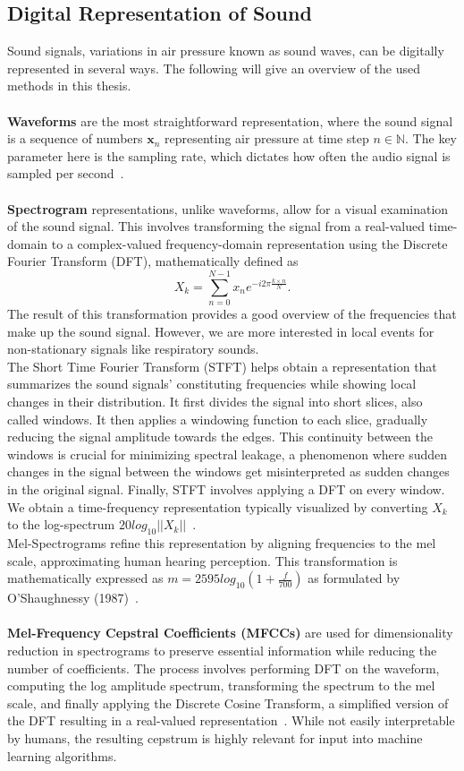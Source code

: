 \subsection{Digital Representation of Sound}
Sound signals, variations in air pressure known as sound waves, can be digitally represented in several ways. The following will give an overview of the used methods in this thesis.\\\\
\textbf{Waveforms} are the most straightforward representation, where the sound signal is a sequence of numbers $\mathbf{x}_n$ representing air pressure at time step $n\in \mathbb{N}$. The key parameter here is the sampling rate, which dictates how often the audio signal is sampled per second~\cite{backstrom2020introduction}.\\\\
\textbf{Spectrogram} representations, unlike waveforms, allow for a visual examination of the sound signal. This involves transforming the signal from a real-valued time-domain to a complex-valued frequency-domain representation using the Discrete Fourier Transform (DFT), mathematically defined as \[ X_k=\sum_{n=0}^{N-1}x_ne^{-i2\pi\frac{k\times n}{N}}.\] The result of this transformation provides a good overview of the frequencies that make up the sound signal. However, we are more interested in local events for non-stationary signals like respiratory sounds.\\
The Short Time Fourier Transform (STFT) helps obtain a representation that summarizes the sound signals' constituting frequencies while showing local changes in their distribution. It first divides the signal into short slices, also called windows. It then applies a windowing function to each slice, gradually reducing the signal amplitude towards the edges. This continuity between the windows is crucial for minimizing spectral leakage, a phenomenon where sudden changes in the signal between the windows get misinterpreted as sudden changes in the original signal. Finally, STFT involves applying a DFT on every window. We obtain a time-frequency representation typically visualized by converting $X_k$ to the log-spectrum $20log_{10}||X_k||$~\cite{backstrom2020introduction}.\\
Mel-Spectrograms refine this representation by aligning frequencies to the mel scale, approximating human hearing perception. This transformation is mathematically expressed as $m=2595log_{10}\left(1+\frac{f}{700}\right)$ as formulated by O'Shaughnessy (1987)~\cite{o1987speech}.\\\\
\textbf{Mel-Frequency Cepstral Coefficients (MFCCs)} are used for dimensionality reduction in spectrograms to preserve essential information while reducing the number of coefficients. The process involves performing DFT on the waveform, computing the log amplitude spectrum, transforming the spectrum to the mel scale, and finally applying the Discrete Cosine Transform, a simplified version of the DFT resulting in a real-valued representation~\cite{backstrom2020introduction}. While not easily interpretable by humans, the resulting cepstrum is highly relevant for input into machine learning algorithms.

